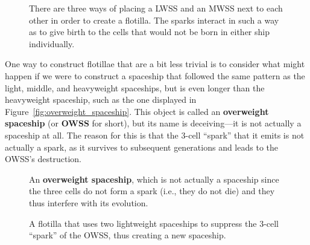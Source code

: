 \begin{figure}[!htb]
	\centering
	\begin{minipage}{.28\textwidth}
		\centering
	\end{minipage} \hfill %
	\begin{minipage}{.37\textwidth}
		\centering
	\end{minipage} \hfill %
	\begin{minipage}{.28\textwidth}
		\centering
	\end{minipage}
	\caption{There are three ways of placing a LWSS and an MWSS next to each other in order to create a flotilla. The  sparks interact in such a way as to give birth to the  cells that would not be born in either ship individually.}\label{fig:lwss_mwss_flotillae}
\end{figure}

One way to construct flotillae that are a bit less trivial is to consider what might happen if we were to construct a spaceship that followed the same pattern as the light, middle, and heavyweight spaceships, but is even longer than the heavyweight spaceship, such as the one displayed in Figure~\ref{fig:overweight_spaceship}. This object is called an \textbf{overweight spaceship} (or \textbf{OWSS} for short), but its name is deceiving---it is not actually a spaceship at all. The reason for this is that the $3$-cell ``spark'' that it emits is not actually a spark, as it survives to subsequent generations and leads to the OWSS's destruction.

\begin{figure}[!htb]
	\centering
	\begin{minipage}[b]{.41\textwidth}
		\centering
		\caption{An \textbf{overweight spaceship}, which is not actually a spaceship since the three  cells do not form a spark (i.e., they do not die) and they thus interfere with its evolution.}\label{fig:overweight_spaceship}
	\end{minipage} \hfill %
	\begin{minipage}[b]{.55\textwidth}
		\centering
		\caption{A flotilla that uses two lightweight spaceships to suppress the $3$-cell ``spark'' of the OWSS, thus creating a new spaceship.}\label{fig:owss_flotilla}
	\end{minipage}
\end{figure}

